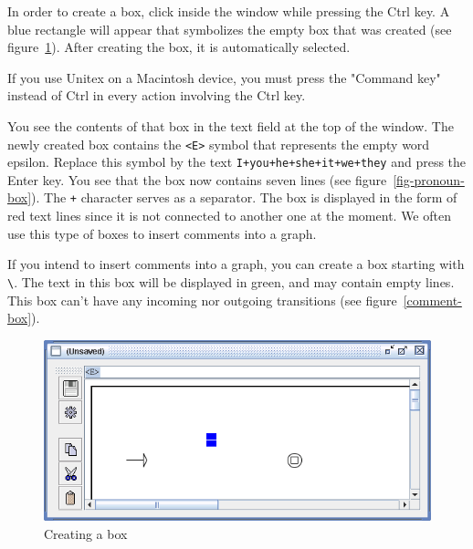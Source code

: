 \bigskip
\noindent In order to create a box, click inside the window while pressing the Ctrl
key.
A blue rectangle will appear that symbolizes the empty box that was created (see
figure~\ref{fig-box-creation}). After creating the box, it is automatically selected. 


\noindent If you use Unitex on a Macintosh device, you must press the "Command key" 
instead of Ctrl in every action involving the Ctrl key.

\bigskip
\noindent You see the contents of that box in the text field at the top of the
window. The newly created box contains the \verb+<E>+ symbol that represents the empty word
epsilon. Replace this symbol by the text \verb$I+you+he+she+it+we+they$ and
press the Enter key. You see that the box now contains seven lines (see
figure~\ref{fig-pronoun-box}). The \verb$+$ character serves as a
separator.\index{\verb$+$} The box is displayed in the form of red text lines since it is 
not connected to another one at the moment.
We often use this type of boxes to insert comments into a
graph. 

\bigskip
\noindent If you intend to insert comments into a graph, you can create a box starting with \verb$\$.
The text in this box will be displayed in green, and may contain empty lines.
This box can't have any incoming nor outgoing transitions (see
figure~\ref{comment-box}).

\begin{figure}[!hb]
\begin{center}
\includegraphics[width=14.5cm]{resources/img/fig5-3.png}
\caption{Creating a box\label{fig-box-creation}}
\end{center}
\end{figure}

